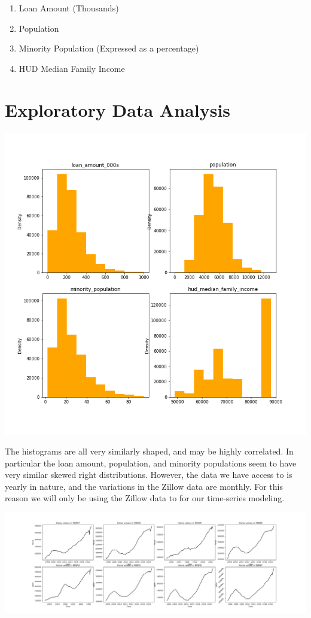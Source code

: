 \documentclass{article}
\begin{document}
	\begin{enumerate}
		\item Loan Amount (Thousands)
		\item Population 
		\item Minority Population (Expressed as a percentage)
		\item HUD Median Family Income 
	\end{enumerate}

	\section{Exploratory Data Analysis}
	
	\includegraphics[scale = 0.5]{../plots/hmda_hist.png}
	
	The histograms are all very similarly shaped, and may be highly correlated. In particular the loan amount, population, and minority 
	populations seem to have very similar skewed right distributions. However, the data we have access to is yearly in nature, and the 
	variations in the Zillow data are monthly. For this reason we will only be using the Zillow data to for our time-series modeling. 

	\includegraphics[scale=0.3]{../plots/zillow.png}
	
\end{document}
